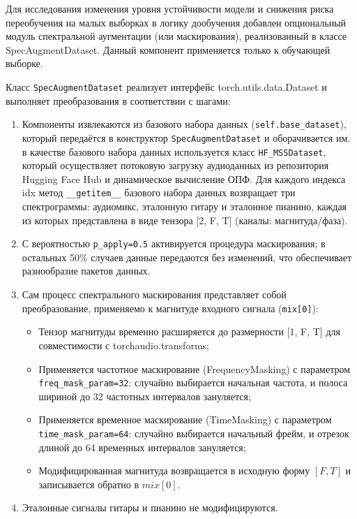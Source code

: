 \documentclass[14pt]{extarticle}
\begin{document}
Для исследования изменения уровня устойчивости модели и снижения риска переобучения на малых выборках в логику дообучения
добавлен опциональный модуль спектральной аугментации (или маскирования), реализованный в классе SpecAugmentDataset. Данный компонент применяется
только к обучающей выборке.

Класс \texttt{SpecAugmentDataset} реализует интерфейс torch.utils.data.Dataset и выполняет преобразования в соответствии с шагами:
\begin{enumerate}[label=\arabic*)]
	\item Компоненты извлекаются из базового набора данных (\texttt{self.base\_dataset}), который передаётся в конструктор \texttt{SpecAugmentDataset} и оборачивается им.
	в качестве базового набора данных используется класс \texttt{HF\_MSSDataset}, который осуществляет потоковую загрузку аудиоданных из репозитория Hugging Face 
	Hub и динамическое вычисление ОПФ. Для каждого индекса idx метод \texttt{\_\_getitem\_\_} базового набора данных возвращает три спектрограммы: аудиомикс,
	эталонную гитару и эталонное пианино, каждая из которых представлена в виде тензора [2, F, T] (каналы: магнитуда/фаза).
	\item С вероятностью \texttt{p\_apply=0.5} активируется процедура маскирования; в остальных 50\% случаев данные передаются без изменений, что обеспечивает разнообразие пакетов данных.
	\item Сам процесс спектрального маскирования представляет собой преобразование, применяемо к магнитуде входного сигнала (\texttt{mix[0]}):
		\begin{itemize}[label=$\bullet$, wide]
			\item Тензор магнитуды временно расширяется до размерности [1, F, T] для совместимости с torchaudio.transforms;
			\item Применяется частотное маскирование (FrequencyMasking) с параметром \texttt{freq\_mask\_param=32}: случайно выбирается начальная частота, и полоса шириной до 32 частотных интервалов зануляется;
			\item Применяется временное маскирование (TimeMasking) с параметром \texttt{time\_mask\_param=64}: случайно выбирается начальный фрейм, и отрезок длиной до 64 временных интервалов зануляется;
			\item Модифицированная магнитуда возвращается в исходную форму $[F, T]$ и записывается обратно в $mix[0]$.
		\end{itemize}
	\item Эталонные сигналы гитары и пианино не модифицируются. 
\end{enumerate}
\end{document}
